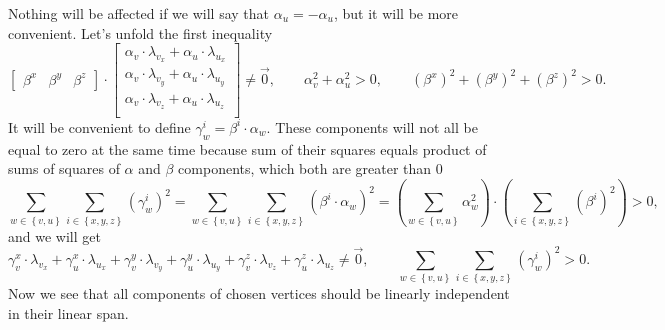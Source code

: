 Nothing will be affected if we will say that $\alpha_u = - \alpha_u$,
but it will be more convenient.
Let's unfold the first inequality
\begin{equation*}
  \begin{bmatrix}
    \beta^x & \beta^y & \beta^z
  \end{bmatrix}
  \cdot \begin{bmatrix}
    \alpha_v \cdot \lambda_{v_x} + \alpha_u \cdot \lambda_{u_x} \\
    \alpha_v \cdot \lambda_{v_y} + \alpha_u \cdot \lambda_{u_y} \\
    \alpha_v \cdot \lambda_{v_z} + \alpha_u \cdot \lambda_{u_z} \\
  \end{bmatrix}
  \neq \vec{0},
  \qquad \alpha_v^2 + \alpha_u^2 > 0,
  \qquad \left( \beta^x \right)^2
    + \left( \beta^y \right)^2
    + \left( \beta^z \right)^2 > 0.
\end{equation*}
It will be convenient to define $\gamma_w^i = \beta^i \cdot \alpha_w$.
These components will not all be equal to zero at the same time because
sum of their squares equals product of sums of squares
of $\alpha$ and $\beta$ components, which both are greater than $0$
\begin{equation*}
  \sum_{w \in \left\{ v, u \right\}}
  \sum_{i \in \left\{ x, y, z \right\}}
    \left( \gamma_w^i \right)^2
  =
  \sum_{w \in \left\{ v, u \right\}}
  \sum_{i \in \left\{ x, y, z \right\}}
    \left( \beta^i \cdot \alpha_w \right)^2
  =
  \left( \sum_{w \in \left\{ v, u \right\}} \alpha_w^2 \right)
  \cdot
  \left( \sum_{i \in \left\{ x, y, z \right\}} \left( \beta^i \right)^2 \right)
  > 0,
\end{equation*}
and we will get
\begin{equation*}
  \gamma_v^x \cdot \lambda_{v_x}
  + \gamma_u^x \cdot \lambda_{u_x}
  + \gamma_v^y \cdot \lambda_{v_y}
  + \gamma_u^y \cdot \lambda_{u_y}
  + \gamma_v^z \cdot \lambda_{v_z}
  + \gamma_u^z \cdot \lambda_{u_z}
  \neq \vec{0},
  \qquad
    \sum_{w \in \left\{ v, u \right\}}
    \sum_{i \in \left\{ x, y, z \right\}}
      \left( \gamma_w^i \right)^2 > 0.
\end{equation*}
Now we see that all components of chosen vertices
should be linearly independent in their linear span.

